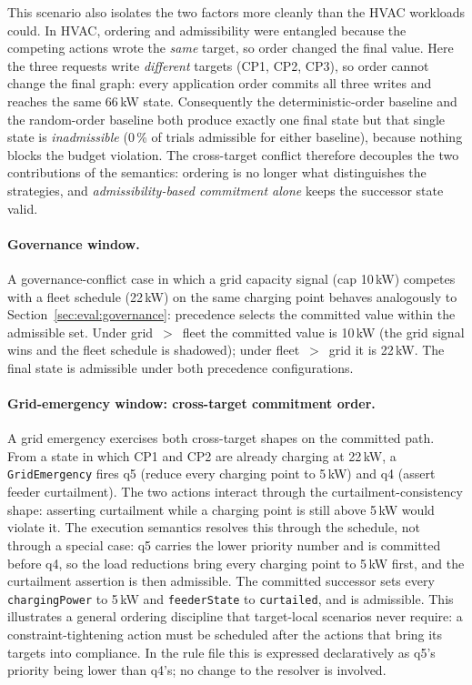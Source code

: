 \documentclass{ieeeaccess}
\theoremstyle{definition}
\theoremstyle{plain}
\theoremstyle{remark}
\begin{document}
This scenario also isolates the two factors more cleanly than the HVAC
workloads could. In HVAC, ordering and admissibility were entangled because the
competing actions wrote the \emph{same} target, so order changed the final
value. Here the three requests write \emph{different} targets (CP1, CP2, CP3),
so order cannot change the final graph: every application order commits all
three writes and reaches the same 66\,kW state. Consequently the
deterministic-order baseline and the random-order baseline both produce exactly
one final state but that single state is \emph{inadmissible} (0\,\% of trials
admissible for either baseline), because nothing blocks the budget violation.
The cross-target conflict therefore decouples the two contributions of the
semantics: ordering is no longer what distinguishes the strategies, and
\emph{admissibility-based commitment alone} keeps the successor state valid.

\paragraph{Governance window.}
A governance-conflict case in which a grid capacity signal (cap 10\,kW) competes
with a fleet schedule (22\,kW) on the same charging point behaves analogously to
Section~\ref{sec:eval:governance}: precedence selects the committed value within
the admissible set. Under grid~$>$~fleet the committed value is 10\,kW (the grid
signal wins and the fleet schedule is shadowed); under fleet~$>$~grid it is
22\,kW. The final state is admissible under both precedence configurations.

\paragraph{Grid-emergency window: cross-target commitment order.}
A grid emergency exercises both cross-target shapes on the committed path. From
a state in which CP1 and CP2 are already charging at 22\,kW, a
\texttt{GridEmergency} fires q5 (reduce every charging point to 5\,kW) and q4
(assert feeder curtailment). The two actions interact through the
curtailment-consistency shape: asserting curtailment while a charging point is
still above 5\,kW would violate it. The execution semantics resolves this
through the schedule, not through a special case: q5 carries the lower priority
number and is committed before q4, so the load reductions bring every charging
point to 5\,kW first, and the curtailment assertion is then admissible. The
committed successor sets every \texttt{chargingPower} to 5\,kW and
\texttt{feederState} to \texttt{curtailed}, and is admissible. This illustrates
a general ordering discipline that target-local scenarios never require: a
constraint-tightening action must be scheduled after the actions that bring its
targets into compliance. In the rule file this is expressed declaratively as
q5's priority being lower than q4's; no change to the resolver is involved.
\end{document}
